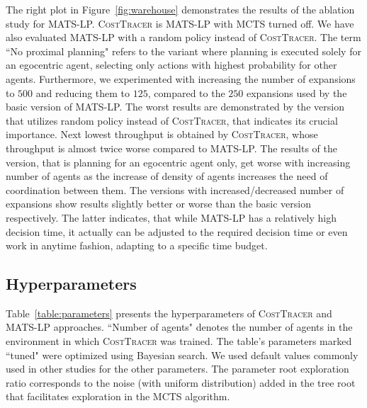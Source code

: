 \documentclass[letterpaper]{article} %
\begin{document}
The right plot in Figure~\ref{fig:warehouse} demonstrates the results of the ablation study for MATS-LP. \textsc{CostTracer} is MATS-LP with MCTS turned off. We have also evaluated MATS-LP with a random policy instead of \textsc{CostTracer}. The term ``No proximal planning" refers to the variant where planning is executed solely for an egocentric agent, selecting only actions with highest probability for other agents. Furthermore, we experimented with increasing the number of expansions to $500$ and reducing them to $125$, compared to the $250$ expansions used by the basic version of MATS-LP. The worst results are demonstrated by the version that utilizes random policy instead of \textsc{CostTracer}, that indicates its crucial importance. Next lowest throughput is obtained by \textsc{CostTracer}, whose throughput is almost twice worse compared to MATS-LP. The results of the version, that is planning for an egocentric agent only, get worse with increasing number of agents as the increase of density of agents increases the need of coordination between them. The versions with increased/decreased number of expansions show results slightly better or worse than the basic version respectively. The latter indicates, that while MATS-LP has a relatively high decision time, it actually can be adjusted to the required decision time or even work in anytime fashion, adapting to a specific time budget.



\subsection{Hyperparameters}

Table~\ref{table:parameters} presents the hyperparameters of \textsc{CostTracer} and \textsc{MATS-LP} approaches. ``Number of agents" denotes the number of agents in the environment in which \textsc{CostTracer} was trained. The table's parameters marked ``tuned" were optimized using Bayesian search. We used default values commonly used in other studies for the other parameters. The parameter root exploration ratio corresponds to the noise (with uniform distribution) added in the tree root that facilitates exploration in the MCTS algorithm.
\end{document}

